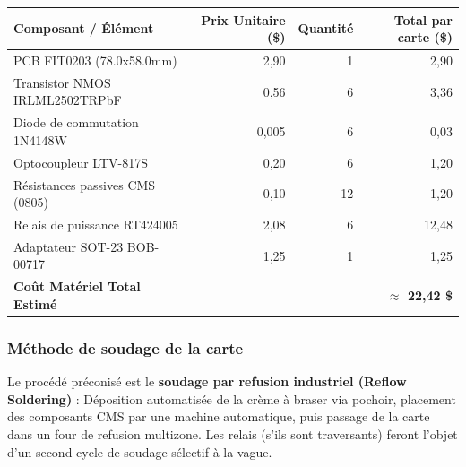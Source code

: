\documentclass[11pt,a4paper]{article}
\begin{document}
\begin{table}[H]
    \centering
    \renewcommand{\arraystretch}{1.2}
    \begin{tabular}{lrrr}
        \toprule
        \textbf{Composant / Élément} & \textbf{Prix Unitaire (\$)} & \textbf{Quantité} & \textbf{Total par carte (\$)} \\
        \midrule
        PCB FIT0203 \cite{dfrobot_pcb} (78.0x58.0mm) & 2,90 & 1 & 2,90 \\
        Transistor NMOS IRLML2502TRPbF \cite{ir_mosfet} & 0,56 & 6 & 3,36 \\
        Diode de commutation 1N4148W \cite{goodwork_diode} & 0,005 & 6 & 0,03 \\
        Optocoupleur LTV-817S \cite{liteon_opto} & 0,20 & 6 & 1,20 \\
        Résistances passives CMS (0805) \cite{yageo_r220, yageo_r10k} & 0,10 & 12 & 1,20 \\
        Relais de puissance RT424005 \cite{te_relais} & 2,08 & 6 & 12,48 \\
        Adaptateur SOT-23 BOB-00717 \cite{sparkfun_sot23} & 1,25 & 1 & 1,25 \\
        \midrule
        \textbf{Coût Matériel Total Estimé} & & & \textbf{$\approx$ 22,42 \$ } \\
        \bottomrule
    \end{tabular}
\end{table}

\subsubsection{Méthode de soudage de la carte}
Le procédé préconisé est le \textbf{soudage par refusion industriel (Reflow Soldering)} :
Déposition automatisée de la crème à braser via pochoir, placement des composants CMS par une machine automatique, puis passage de la carte dans un four de refusion multizone. Les relais (s'ils sont traversants) feront l'objet d'un second cycle de soudage sélectif à la vague.
\end{document}
